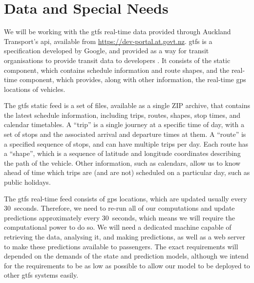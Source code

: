 \documentclass[12pt,a4paper]{article}
\begin{document}


\section{Data and Special Needs}
\label{sec:data}

We will be working with the \gls{gtfs} real-time data provided through Auckland Transport's
\gls{api}, available from \url{https://dev-portal.at.govt.nz}.
\gls{gtfs} is a specification developed by Google,
and provided as a way for transit organisations to provide transit data to developers
\citep{gtfs}.
It consists of the static component, which contains schedule information and route shapes,
and the real-time component, which provides,
along with other information,
the real-time \gls{gps} locations of vehicles.


The \gls{gtfs} static feed is a set of files, available as a single ZIP archive,
that contains the latest schedule information, including trips, routes, shapes, stop times,
and calendar timetables.
A ``trip'' is a single journey at a specific time of day,
with a set of stops and the associated arrival and departure times at them.
A ``route'' is a specified sequence of stops,
and can have multiple trips per day.
Each route has a ``shape'', which is a sequence of latitude and longitude coordinates
describing the path of the vehicle.
Other information, such as calendars, allow us to know ahead of time which trips
are (and are not) scheduled on a particular day,
such as public holidays.


The \gls{gtfs} real-time feed consists of \gls{gps} locations,
which are updated usually every 30~seconds.
Therefore, we need to re-run all of our computations and update predictions approximately
every 30~seconds, which means we will require the computational power to do so.
We will need a dedicated machine capable of
retrieving the data, analysing it, and making predictions,
as well as a web server to make these predictions available to passengers.
The exact requirements will depended on the demands of the state and prediction models,
although we intend for the requirements to be as low as possible
to allow our model to be deployed to other \gls{gtfs} systems easily.



\end{document}
